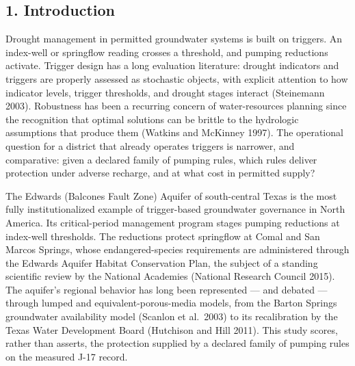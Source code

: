\subsection{1. Introduction}\label{edw-introduction}

Drought management in permitted groundwater systems is built on
triggers. An index-well or springflow reading crosses a threshold, and
pumping reductions activate. Trigger design has a long evaluation
literature: drought indicators and triggers are properly assessed as
stochastic objects, with explicit attention to how indicator levels,
trigger thresholds, and drought stages interact (Steinemann 2003).
Robustness has been a recurring concern of water-resources planning
since the recognition that optimal solutions can be brittle to the
hydrologic assumptions that produce them (Watkins and McKinney 1997).
The operational question for a district that already operates triggers
is narrower, and comparative: given a declared family of pumping rules,
which rules deliver protection under adverse recharge, and at what cost
in permitted supply?

The Edwards (Balcones Fault Zone) Aquifer of south-central Texas is the
most fully institutionalized example of trigger-based groundwater
governance in North America. Its critical-period management program
stages pumping reductions at index-well thresholds. The reductions
protect springflow at Comal and San Marcos Springs, whose
endangered-species requirements are administered through the Edwards
Aquifer Habitat Conservation Plan, the subject of a standing scientific
review by the National Academies (National Research Council 2015). The
aquifer's regional behavior has long been represented --- and debated
--- through lumped and equivalent-porous-media models, from the Barton
Springs groundwater availability model (Scanlon et al.~2003) to its
recalibration by the Texas Water Development Board (Hutchison and Hill
2011). This study scores, rather than asserts, the protection supplied
by a declared family of pumping rules on the measured J-17 record.

